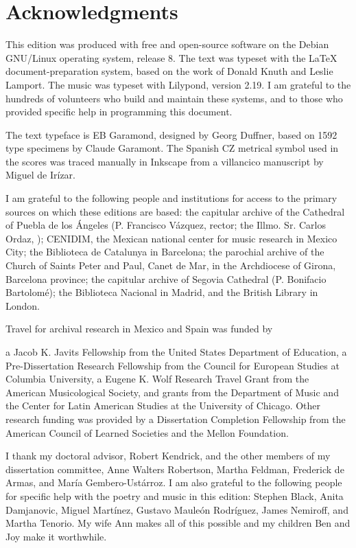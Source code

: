\section*{Acknowledgments}

This edition was produced with free and open-source software on the Debian 
GNU/Linux operating system, release 8.
The text was typeset with the \LaTeX{} document-preparation system, based on 
the work of Donald Knuth and Leslie Lamport.
The music was typeset with Lilypond, version 2.19.
I am grateful to the hundreds of volunteers who build and maintain these 
systems, and to those who provided specific help in programming this document.

The text typeface is EB Garamond, designed by Georg Duffner, based on 1592 type 
specimens by Claude Garamont.
The Spanish CZ metrical symbol used in the scores was traced manually in 
Inkscape from a villancico manuscript by Miguel de Irízar.

I am grateful to the following people and institutions for access to the 
primary sources on which these editions are based: 
the capitular archive of the Cathedral of Puebla de los Ángeles (P. Francisco 
Vázquez, rector; the Illmo. Sr. Carlos Ordaz, );
CENIDIM, the Mexican national center for music research in Mexico City;
the Biblioteca de Catalunya in Barcelona;
the parochial archive of the Church of Saints Peter and Paul, Canet de Mar, in 
the Archdiocese of Girona, Barcelona province;
the capitular archive of Segovia Cathedral (P. Bonifacio Bartolomé);
the Biblioteca Nacional in Madrid, and
the British Library in London.

Travel for archival research in Mexico and Spain was funded by 
\begin{anonymize}
    a Jacob K. Javits Fellowship from the United States Department of Education, 
    a Pre-Dissertation Research Fellowship from the Council for European Studies at 
    Columbia University, 
    a Eugene K. Wolf Research Travel Grant from the American Musicological Society, 
    and grants from the Department of Music and the Center for Latin American 
    Studies at the University of Chicago.
    Other research funding was provided by a Dissertation Completion Fellowship 
    from the American Council of Learned Societies and the Mellon Foundation.

    I thank my doctoral advisor, Robert Kendrick, and the other members of my 
    dissertation committee, Anne Walters Robertson, Martha Feldman, Frederick de 
    Armas, and María Gembero-Ustárroz.
    I am also grateful to the following people for specific help with the poetry 
    and music in this edition:
    Stephen Black,
    Anita Damjanovic, 
    Miguel Martínez, 
    Gustavo Mauleón Rodríguez,
    James Nemiroff, and
    Martha Tenorio.
    My wife Ann makes all of this possible and my children Ben and Joy make it
    worthwhile.
\end{anonymize}
